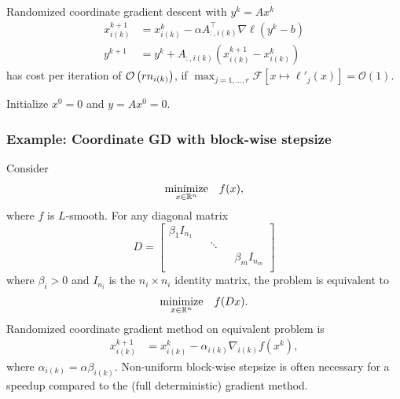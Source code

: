 \documentclass[10pt,mathserif]{beamer}
\begin{document}
\begin{frame}
Randomized coordinate gradient descent with $y^k=Ax^k$
\begin{align*}
  x^{k+1}_{i(k)} & = x^{k}_{i(k)} - \alpha A^\intercal_{:,i(k)}  \nabla \ell(y^k-b)\\
y^{k+1}&=y^k+A_{:,i(k)}(x^{k+1}_{i(k)}-x^{k}_{i(k)})
\end{align*}
has cost per iteration of ${\mathcal{O}\left(rn_{i(k)}\right)}$, if $\max_{j=1,\dots,r}\mathcal{F}[x\mapsto \ell'_j(x)]=\mathcal{O}(1)$.

\vspace{0.2in}

Initialize $x^0=0$ and $y=Ax^0=0$.
\end{frame}


\begin{frame}
\frametitle{Example: Coordinate GD with block-wise stepsize}
Consider 
\begin{align*}
\begin{array}{ll}
\underset{x\in \mathbb{R}^n}{\mbox{minimize}}
  &f(x),
  \end{array}
\end{align*}
where $f$ is $L$-smooth.
For any diagonal matrix
\begingroup\makeatletter\def\f@size{8}\check@mathfonts
\[
D=\begin{bmatrix}
\beta_1I_{n_1}&&&&\\
&&\ddots\\
&&&&\beta_mI_{n_m}\\
\end{bmatrix}
\]
\endgroup
where  $\beta_i>0$ and $I_{n_i}$ is the $n_i\times n_i$ identity matrix, the problem is equivalent to
\vspace{-10pt}
\begin{align*}
\begin{array}{ll}
\underset{x\in \mathbb{R}^n}{\mbox{minimize}}
  &f(Dx).
  \end{array}
\end{align*}
Randomized coordinate gradient method on equivalent problem is
\begin{align*}
  x^{k+1}_{i(k)} & = x^{k}_{i(k)} - \alpha_{i(k)} \nabla_{i(k)}f(x^{k}),
\end{align*}
where $\alpha_{i(k)}=\alpha \beta_{i(k)}$.
Non-uniform block-wise stepsize is often necessary for a speedup compared to the (full deterministic) gradient method.
\end{frame}
\end{document}
